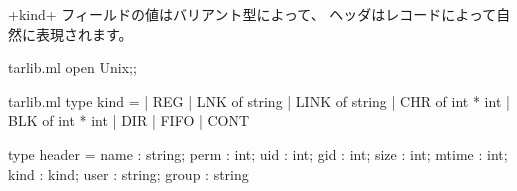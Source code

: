 \ml+kind+ フィールドの値はバリアント型によって、 ヘッダはレコードによって自然に表現されます。
%
\begin{codefile}{tarlib.ml}
open Unix;;
\end{codefile}
%
\begin{listingcodefile}{tarlib.ml}
type kind =
  | REG | LNK of string | LINK of string | CHR of int * int
  | BLK of int * int | DIR | FIFO | CONT

type header =
    { name : string; perm : int; uid : int; gid : int; size : int;
      mtime : int; kind : kind; user : string; group : string }
\end{listingcodefile}

